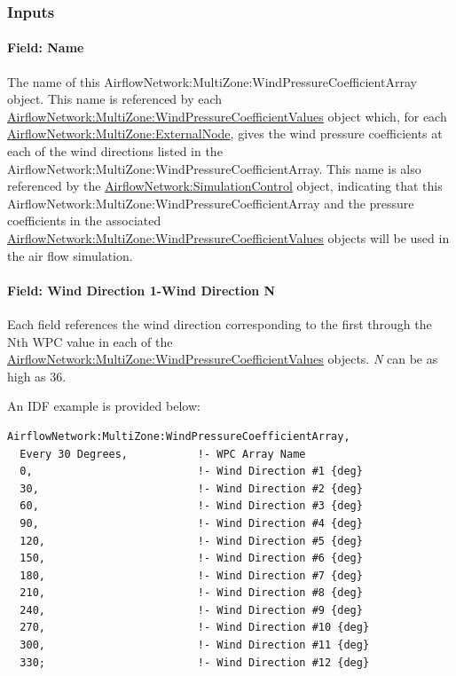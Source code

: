 \subsubsection{Inputs}\label{inputs-9-001}

\paragraph{Field: Name}\label{field-name-9-001}

The name of this AirflowNetwork:MultiZone:WindPressureCoefficientArray object. This name is referenced by each \hyperref[airflownetworkmultizonewindpressurecoefficientvalues]{AirflowNetwork:MultiZone:WindPressureCoefficientValues} object which, for each \hyperref[airflownetworkmultizoneexternalnode]{AirflowNetwork:MultiZone:ExternalNode}, gives the wind pressure coefficients at each of the wind directions listed in the AirflowNetwork:MultiZone:WindPressureCoefficientArray. This name is also referenced by the \hyperref[airflownetworksimulationcontrol]{AirflowNetwork:\hyperref[simulationcontrol]{SimulationControl}} object, indicating that this AirflowNetwork:MultiZone:WindPressureCoefficientArray and the pressure coefficients in the associated \hyperref[airflownetworkmultizonewindpressurecoefficientvalues]{AirflowNetwork:MultiZone:WindPressureCoefficientValues} objects will be used in the air flow simulation.

\paragraph{Field: Wind Direction 1-Wind Direction N}\label{field-wind-direction-1-wind-direction-n}

Each field references the wind direction corresponding to the first through the Nth WPC value in each of the \hyperref[airflownetworkmultizonewindpressurecoefficientvalues]{AirflowNetwork:MultiZone:WindPressureCoefficientValues} objects. \emph{N} can be as high as 36.

An IDF example is provided below:

\begin{lstlisting}
AirflowNetwork:MultiZone:WindPressureCoefficientArray,
  Every 30 Degrees,           !- WPC Array Name
  0,                          !- Wind Direction #1 {deg}
  30,                         !- Wind Direction #2 {deg}
  60,                         !- Wind Direction #3 {deg}
  90,                         !- Wind Direction #4 {deg}
  120,                        !- Wind Direction #5 {deg}
  150,                        !- Wind Direction #6 {deg}
  180,                        !- Wind Direction #7 {deg}
  210,                        !- Wind Direction #8 {deg}
  240,                        !- Wind Direction #9 {deg}
  270,                        !- Wind Direction #10 {deg}
  300,                        !- Wind Direction #11 {deg}
  330;                        !- Wind Direction #12 {deg}
\end{lstlisting}

